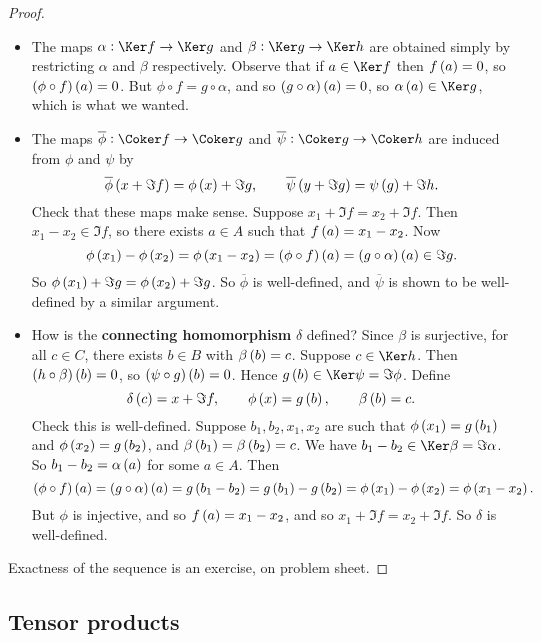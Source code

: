 \begin{proof}
\hfill
\begin{itemize}
\item The maps $ \alpha : \Ker f \to \Ker g $ and $ \beta : \Ker g \to \Ker h $ are obtained simply by restricting $ \alpha $ and $ \beta $ respectively. Observe that if $ a \in \Ker f $ then $ f\br{a} = 0 $, so $ \br{\phi \circ f}\br{a} = 0 $. But $ \phi \circ f = g \circ \alpha $, and so $ \br{g \circ \alpha}\br{a} = 0 $, so $ \alpha\br{a} \in \Ker g $, which is what we wanted.
\item The maps $ \overline{\phi} : \Coker f \to \Coker g $ and $ \overline{\psi} : \Coker g \to \Coker h $ are induced from $ \phi $ and $ \psi $ by
$$ \overline{\phi}\br{x + \Im f} = \phi\br{x} + \Im g, \qquad \overline{\psi}\br{y + \Im g} = \psi\br{g} + \Im h. $$
Check that these maps make sense. Suppose $ x_1 + \Im f = x_2 + \Im f $. Then $ x_1 - x_2 \in \Im f $, so there exists $ a \in A $ such that $ f\br{a} = x_1 - x_2 $. Now
$$ \phi\br{x_1} - \phi\br{x_2} = \phi\br{x_1 - x_2} = \br{\phi \circ f}\br{a} = \br{g \circ \alpha}\br{a} \in \Im g. $$
So $ \phi\br{x_1} + \Im g = \phi\br{x_2} + \Im g $. So $ \overline{\phi} $ is well-defined, and $ \overline{\psi} $ is shown to be well-defined by a similar argument.
\item How is the \textbf{connecting homomorphism} $ \delta $ defined? Since $ \beta $ is surjective, for all $ c \in C $, there exists $ b \in B $ with $ \beta\br{b} = c $. Suppose $ c \in \Ker h $. Then $ \br{h \circ \beta}\br{b} = 0 $, so $ \br{\psi \circ g}\br{b} = 0 $. Hence $ g\br{b} \in \Ker \psi = \Im \phi $. Define
$$ \delta\br{c} = x + \Im f, \qquad \phi\br{x} = g\br{b}, \qquad \beta\br{b} = c. $$
Check this is well-defined. Suppose $ b_1, b_2, x_1, x_2 $ are such that $ \phi\br{x_1} = g\br{b_1} $ and $ \phi\br{x_2} = g\br{b_2} $, and $ \beta\br{b_1} = \beta\br{b_2} = c $. We have $ b_1 - b_2 \in \Ker \beta = \Im \alpha $. So $ b_1 - b_2 = \alpha\br{a} $ for some $ a \in A $. Then
$$ \br{\phi \circ f}\br{a} = \br{g \circ \alpha}\br{a} = g\br{b_1 - b_2} = g\br{b_1} - g\br{b_2} = \phi\br{x_1} - \phi\br{x_2} = \phi\br{x_1 - x_2}. $$
But $ \phi $ is injective, and so $ f\br{a} = x_1 - x_2 $, and so $ x_1 + \Im f = x_2 + \Im f $. So $ \delta $ is well-defined.
\end{itemize}
Exactness of the sequence is an exercise, on problem sheet.
\end{proof}

\subsection{Tensor products}

